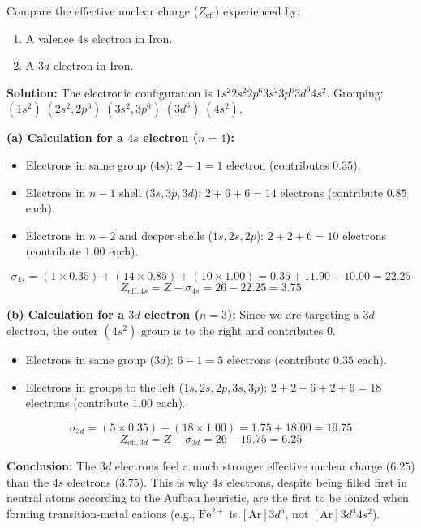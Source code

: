 \documentclass[12pt,a4paper]{article}
\begin{document}
\begin{tcolorbox}[examplebox, title={Example 1.2: Calculation for Iron ($Fe$, $Z=26$)}]
  Compare the effective nuclear charge ($Z_{\text{eff}}$) experienced by:
  \begin{enumerate}[label=(\alph*), itemsep=1pt, topsep=2pt]
    \item A valence $4s$ electron in Iron.
    \item A $3d$ electron in Iron.
  \end{enumerate}
  \par\vspace{4pt}
  \textbf{Solution:}
  The electronic configuration is $1s^2 2s^2 2p^6 3s^2 3p^6 3d^6 4s^2$.
  Grouping: $(1s^2) \; (2s^2, 2p^6) \; (3s^2, 3p^6) \; (3d^6) \; (4s^2)$.
  \par\vspace{4pt}
  \textbf{(a) Calculation for a $4s$ electron ($n=4$):}
  \begin{itemize}[leftmargin=*, itemsep=2pt]
    \item Electrons in same group ($4s$): $2 - 1 = 1$ electron (contributes $0.35$).
    \item Electrons in $n-1$ shell ($3s, 3p, 3d$): $2 + 6 + 6 = 14$ electrons (contribute $0.85$ each).
    \item Electrons in $n-2$ and deeper shells ($1s, 2s, 2p$): $2 + 2 + 6 = 10$ electrons (contribute $1.00$ each).
  \end{itemize}
  \[ \sigma_{4s} = (1 \times 0.35) + (14 \times 0.85) + (10 \times 1.00) = 0.35 + 11.90 + 10.00 = 22.25 \]
  \[ Z_{\text{eff}, 4s} = Z - \sigma_{4s} = 26 - 22.25 = 3.75 \]
  \par\vspace{4pt}
  \textbf{(b) Calculation for a $3d$ electron ($n=3$):}
  Since we are targeting a $3d$ electron, the outer $(4s^2)$ group is to the right and contributes $0$.
  \begin{itemize}[leftmargin=*, itemsep=2pt]
    \item Electrons in same group ($3d$): $6 - 1 = 5$ electrons (contribute $0.35$ each).
    \item Electrons in groups to the left ($1s, 2s, 2p, 3s, 3p$): $2 + 2 + 6 + 2 + 6 = 18$ electrons (contribute $1.00$ each).
  \end{itemize}
  \[ \sigma_{3d} = (5 \times 0.35) + (18 \times 1.00) = 1.75 + 18.00 = 19.75 \]
  \[ Z_{\text{eff}, 3d} = Z - \sigma_{3d} = 26 - 19.75 = 6.25 \]
  \par\vspace{4pt}
  \textbf{Conclusion:} The $3d$ electrons feel a much stronger effective nuclear charge ($6.25$) than the $4s$ electrons ($3.75$). This is why $4s$ electrons, despite being filled first in neutral atoms according to the Aufbau heuristic, are the first to be ionized when forming transition-metal cations (e.g., $\text{Fe}^{2+}$ is $[\text{Ar}]3d^6$, not $[\text{Ar}]3d^4 4s^2$).
\end{tcolorbox}
\end{document}
